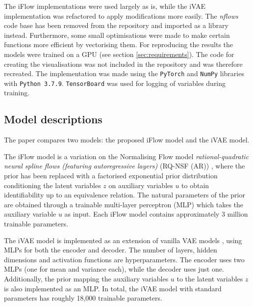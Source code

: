 The iFlow implementations were used largely as is, while the iVAE implementation was refactored to apply modifications more easily. The \textit{nflows} code base has been removed from the repository and imported as a library instead. Furthermore, some small optimisations were made to make certain functions more efficient by vectorising them. For reproducing the results the models were trained on a GPU (see section \ref{sec:requirements}).  The code for creating the visualisations was not included in the repository and was therefore recreated. 
The implementation was made using the \texttt{PyTorch} and \texttt{NumPy} libraries with \texttt{Python 3.7.9}. \texttt{TensorBoard} was used for logging of variables during training.

\subsection{Model descriptions}

The paper compares two models: the proposed iFlow model and the iVAE model. 

The iFlow model is a variation on the Normalising Flow model \textit{rational-quadratic neural spline flows (featuring autoregressive layers)} (RQ-NSF (AR)) \cite{durkan2019neural}, where the prior has been replaced with a factorised exponential prior distribution conditioning the latent variables $z$ on auxiliary variables $u$ to obtain identifiability up to an equivalence relation. The natural parameters of the prior are obtained through a trainable multi-layer perceptron (MLP) which takes the auxiliary variable $u$ as input. Each iFlow model contains approximately 3 million trainable parameters.

The iVAE model is implemented as an extension of vanilla VAE models \cite{kingma2013auto}, using MLPs for both the encoder and decoder. The number of layers, hidden dimensions and activation functions are hyperparameters. The encoder uses two MLPs (one for mean and variance each), while the decoder uses just one. Additionally, the prior mapping the auxiliary variables $u$ to the latent variables $z$ is also implemented as an MLP. In total, the iVAE model with standard parameters has roughly 18,000 trainable parameters.

